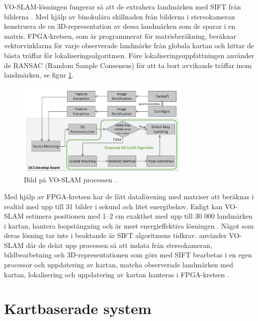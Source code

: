 VO-SLAM-lösningen fungerar så att de extrahera landmärken med SIFT från bilderna \citep{voslam}. Med hjälp av binokulära skillnaden från bilderna i stereokameran konstruera de en 3D-representation av dessa landmärken som de sparar i en matris. FPGA-kretsen, som är programmerat för matrisberäkning, beräknar vektorvinklarna för varje observerade landmärke från globala kartan och hittar de bästa träffar för lokaliseringsalgoritmen. Före lokaliseringsuppfattningen använder de RANSAC (Random Sample Consensus) för att ta bort avvikande träffar inom landmärken, se figur \ref{voslamprocess}. 

\begin{figure}[ht]
    \begin{center}
    \includegraphics[width=0.75\textwidth]{voslam.JPG}
    \caption{Bild på VO-SLAM processen \citep{voslam}.}
    \label{voslamprocess}
    \end{center}
\end{figure}

Med hjälp av FPGA-kretsen har de fått dataförening med matriser att beräknas i realtid med upp till 31 bilder i sekund och litet energibehov. Enligt \cite{voslam} kan VO-SLAM estimera positionen med 1–2 cm exakthet med upp till 30 000 landmärken i kartan, hantera loopstängning och är mest energieffektiva lösningen \citep{voslam}. Något som deras lösning tar inte i beaktande är SIFT algoritmens tidkrav. \cite{voslamlatif} använder VO-SLAM där de delat upp processen så att indata från stereokameran, bildbearbetning och 3D-representationen som görs med SIFT bearbetas i en egen processor och uppdatering av kartan, matcha observerade landmärken med kartan, lokalisering och uppdatering av kartan hanteras i FPGA-kretsen \citep{voslamlatif}. 

\section{Kartbaserade system}

